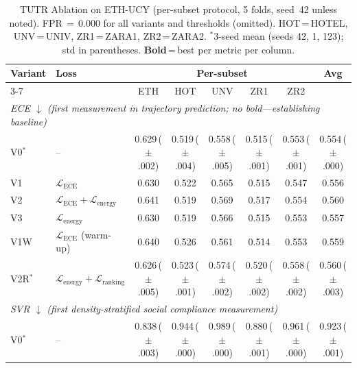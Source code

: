 \documentclass[journal,letterpaper]{IEEEtran}
\begin{document}
\begin{table}[t]
\caption{TUTR Ablation on ETH-UCY (per-subset protocol, 5 folds,
  seed~42 unless noted).
  FPR\,$=$\,0.000 for all variants and thresholds (omitted).
  HOT\,=\,HOTEL, UNV\,=\,UNIV, ZR1\,=\,ZARA1, ZR2\,=\,ZARA2.
  $^*$3-seed mean (seeds 42, 1, 123); std in parentheses.
  \textbf{Bold}\,=\,best per metric per column.}
\label{tab:ablation}
\centering
\setlength{\tabcolsep}{4.5pt}
\begin{tabular}{l l c c c c c c}
\toprule
\multirow{2}{*}{Variant} & \multirow{2}{*}{Loss} &
  \multicolumn{5}{c}{Per-subset} & \multirow{2}{*}{Avg} \\
\cmidrule(lr){3-7}
& & ETH & HOT & UNV & ZR1 & ZR2 & \\
\midrule
\multicolumn{8}{l}{\textit{ECE $\downarrow$ \quad
  (\emph{first measurement in trajectory prediction;
   no bold---establishing baseline})}} \\[1pt]
V0$^*$  & --
  & 0.629\,\scriptsize{({\tiny$\pm$.002})}
  & 0.519\,\scriptsize{({\tiny$\pm$.004})}
  & 0.558\,\scriptsize{({\tiny$\pm$.005})}
  & 0.515\,\scriptsize{({\tiny$\pm$.001})}
  & 0.553\,\scriptsize{({\tiny$\pm$.001})}
  & 0.554\,\scriptsize{({\tiny$\pm$.000})} \\
V1   & $\mathcal{L}_\text{ECE}$
  & 0.630 & 0.522 & 0.565 & 0.515 & 0.547 & 0.556 \\
V2   & $\mathcal{L}_\text{ECE}{+}\mathcal{L}_\text{energy}$
  & 0.641 & 0.519 & 0.569 & 0.517 & 0.554 & 0.560 \\
V3   & $\mathcal{L}_\text{energy}$
  & 0.630 & 0.519 & 0.566 & 0.515 & 0.553 & 0.557 \\
V1W  & $\mathcal{L}_\text{ECE}$ (warm-up)
  & 0.640 & 0.526 & 0.561 & 0.514 & 0.553 & 0.559 \\
V2R$^*$ & $\mathcal{L}_\text{energy}{+}\mathcal{L}_\text{ranking}$
  & 0.626\,\scriptsize{({\tiny$\pm$.005})}
  & 0.523\,\scriptsize{({\tiny$\pm$.001})}
  & 0.574\,\scriptsize{({\tiny$\pm$.002})}
  & 0.520\,\scriptsize{({\tiny$\pm$.002})}
  & 0.558\,\scriptsize{({\tiny$\pm$.002})}
  & 0.560\,\scriptsize{({\tiny$\pm$.003})} \\
\midrule
\multicolumn{8}{l}{\textit{SVR $\downarrow$ \quad
  (\emph{first density-stratified social compliance measurement})}} \\[1pt]
V0$^*$  & --
  & 0.838\,\scriptsize{({\tiny$\pm$.003})}
  & 0.944\,\scriptsize{({\tiny$\pm$.000})}
  & 0.989\,\scriptsize{({\tiny$\pm$.000})}
  & 0.880\,\scriptsize{({\tiny$\pm$.001})}
  & 0.961\,\scriptsize{({\tiny$\pm$.000})}
  & 0.923\,\scriptsize{({\tiny$\pm$.001})} \\

\end{tabular}
\end{table}
\end{document}
